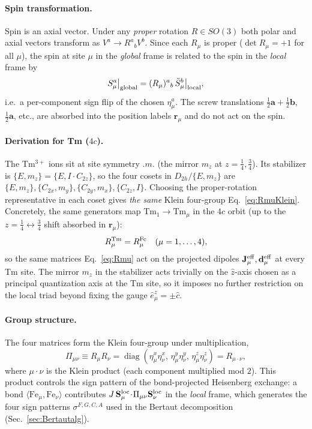 \documentclass[reprint,amsmath,amssymb,aps,prb,longbibliography]{revtex4-2}
\newcommand{\Jeff}{\mathbf{J}^{\rm eff}}
\newcommand{\deff}{\mathbf{d}^{\rm eff}}
\newcommand{\bfS}{\mathbf{S}}
\newcommand{\bfr}{\mathbf{r}}
\newcommand{\bfa}{\mathbf{a}}
\newcommand{\bfb}{\mathbf{b}}
\DeclareMathOperator{\diag}{diag}
\begin{document}
\paragraph{Spin transformation.} Spin is an axial vector. Under any
\emph{proper} rotation $R\in SO(3)$ both polar and axial vectors
transform as $V^a\to R^a{}_b V^b$. Since each $R_\mu$ is proper
($\det R_\mu = +1$ for all $\mu$), the spin at site $\mu$ in the
\emph{global} frame is related to the spin in the \emph{local} frame by
\begin{equation}
S^a_\mu\bigr|_{\rm global} = (R_\mu)^a{}_b\,\tilde S^b_\mu\bigr|_{\rm local},
\label{eq:Smutransform}
\end{equation}
i.e.\ a per-component sign flip of the chosen $\eta^a_\mu$. The screw
translations $\tfrac12\bfa+\tfrac12\bfb$, $\tfrac12\bfa$, etc., are
absorbed into the position labels $\bfr_\mu$ and do not act on the spin.

\paragraph{Derivation for Tm ($4c$).} The Tm$^{3+}$ ions sit at site
symmetry $.m.$ (the mirror $m_z$ at $z=\tfrac14,\tfrac34$). Its
stabilizer is $\{E,m_z\} = \{E,I\!\cdot\!C_{2z}\}$, so the four cosets
in $D_{2h}/\{E,m_z\}$ are
$\{E,m_z\},\{C_{2x},m_y\},\{C_{2y},m_x\},\{C_{2z},I\}$. Choosing the
proper-rotation representative in each coset gives \emph{the same}
Klein four-group Eq.~\eqref{eq:RmuKlein}. Concretely, the same
generators map $\mathrm{Tm}_1\to\mathrm{Tm}_\mu$ in the $4c$ orbit (up
to the $z=\tfrac14\leftrightarrow\tfrac34$ shift absorbed in $\bfr_\mu$):
\begin{equation}
R^{\rm Tm}_\mu = R^{\rm Fe}_\mu \quad(\mu=1,\ldots,4),
\label{eq:RTmequalsRFe}
\end{equation}
so the same matrices Eq.~\eqref{eq:Rmu} act on the projected dipoles
$\Jeff_\mu,\deff_\mu$ at every Tm site. The mirror $m_z$ in the
stabilizer acts trivially on the $\hat z$-axis chosen as a principal
quantization axis at the Tm site, so it imposes no further restriction
on the local triad beyond fixing the gauge $\hat e^z_\mu = \pm\hat c$.

\paragraph{Group structure.} The four matrices form the Klein
four-group under multiplication,
\begin{equation}
\Pi_{\mu\nu} \equiv R_\mu R_\nu = \diag(\eta_\mu^x\eta_\nu^x,\,
\eta_\mu^y\eta_\nu^y,\,\eta_\mu^z\eta_\nu^z) = R_{\mu\cdot\nu},
\label{eq:Pimu}
\end{equation}
where $\mu\cdot\nu$ is the Klein product (each component multiplied
mod $2$). This product controls the sign pattern of the
bond-projected Heisenberg exchange: a bond
$\langle\mathrm{Fe}_\mu,\mathrm{Fe}_\nu\rangle$ contributes
$J\,\bfS_\mu^{\rm loc}\!\cdot\!\Pi_{\mu\nu}\bfS_\nu^{\rm loc}$ in the
\emph{local} frame, which generates the four sign patterns
$\sigma^{F,G,C,A}$ used in the Bertaut decomposition
(Sec.~\ref{sec:Bertautalg}).
\end{document}
